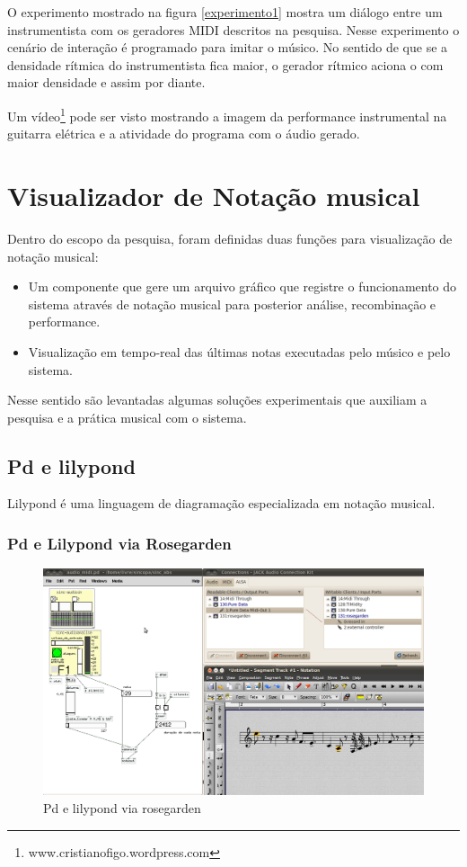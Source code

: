 \documentclass{ppgmus}
\begin{document}
O experimento mostrado na figura \ref{experimento1} mostra um diálogo
entre um instrumentista com os geradores MIDI descritos na pesquisa.
Nesse experimento o cenário de interação é programado para imitar
o músico. No sentido de que se a densidade rítmica do instrumentista fica maior,
o gerador rítmico aciona o com maior densidade e assim por diante.

Um vídeo\footnote{www.cristianofigo.wordpress.com} pode ser visto mostrando a imagem da performance instrumental
na guitarra elétrica e a atividade do programa com o áudio gerado.

\section{Visualizador de Notação musical}
\label{sec-notacao}



Dentro do escopo da pesquisa, foram definidas duas funções
para visualização de notação musical:

\begin{itemize}
 \item Um componente que gere um arquivo gráfico que registre o funcionamento
do sistema através de notação musical para posterior análise, recombinação e performance.
 \item Visualização em tempo-real das últimas notas executadas pelo músico e pelo sistema.
\end{itemize}


Nesse sentido são levantadas algumas soluções experimentais que auxiliam a pesquisa e 
a prática musical com o sistema.


\subsection{Pd e lilypond}

Lilypond é uma linguagem de diagramação especializada
em notação musical.



\subsubsection{Pd e Lilypond via Rosegarden}

\begin{figure}
\includegraphics[scale=.6]{audio2midi}
\caption{Pd e lilypond via rosegarden}
\label{pdlilypond1}
\end{figure} 
\end{document}
